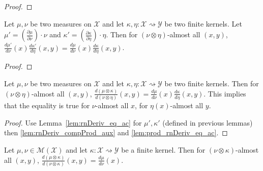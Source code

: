 \begin{proof} \leanok
\end{proof}

\begin{lemma}
  \label{lem:prod_rnDeriv_eq_ac}
  \leanok
  Let $\mu, \nu$ be two measures on $\mathcal X$ and let $\kappa, \eta : \mathcal X \rightsquigarrow \mathcal Y$ be two finite kernels. Let $\mu' = \left(\frac{\partial \mu}{\partial \nu}\right) \cdot \nu$ and $\kappa' = \left(\frac{\partial \kappa}{\partial \eta}\right) \cdot \eta$. Then for $(\nu \otimes \eta)$-almost all $(x, y)$, $\frac{d\mu'}{d\nu}(x)\frac{d \kappa'}{d \eta}(x,y) = \frac{d\mu}{d\nu}(x)\frac{d \kappa}{d \eta}(x,y)$.
\end{lemma}

\begin{proof} \leanok
\end{proof}

\begin{lemma}
  \label{lem:rnDeriv_compProd}
  \leanok
  Let $\mu, \nu$ be two measures on $\mathcal X$ and let $\kappa, \eta : \mathcal X \rightsquigarrow \mathcal Y$ be two finite kernels. Then for $(\nu \otimes \eta)$-almost all $(x, y)$, $\frac{d (\mu \otimes \kappa)}{d (\nu \otimes \eta)}(x,y) = \frac{d\mu}{d\nu}(x)\frac{d \kappa}{d \eta}(x,y)$.
  This implies that the equality is true for $\nu$-almost all $x$, for $\eta(x)$-almost all $y$.
\end{lemma}

\begin{proof} \leanok
{}
Use Lemma~\ref{lem:rnDeriv_eq_ac} for $\mu', \kappa'$ (defined in previous lemmas) then \ref{lem:rnDeriv_compProd_aux} and \ref{lem:prod_rnDeriv_eq_ac}.
\end{proof}


\begin{lemma}
  \label{cor:rnDeriv_compProd_left}
  \leanok
  Let $\mu, \nu \in \mathcal M(\mathcal X)$ and let $\kappa : \mathcal X \rightsquigarrow \mathcal Y$ be a finite kernel. Then for $(\nu \otimes \kappa)$-almost all $(x, y)$, $\frac{d (\mu \otimes \kappa)}{d (\nu \otimes \kappa)}(x,y) = \frac{d\mu}{d\nu}(x)$.
\end{lemma}


